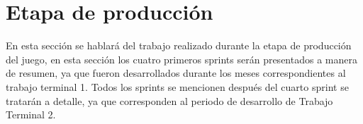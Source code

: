 \section{Etapa de producción}
En esta sección se hablará del trabajo realizado durante la etapa de producción 
del juego, en esta sección los cuatro primeros sprints serán presentados a manera 
de resumen, ya que fueron desarrollados durante los meses correspondientes al 
trabajo terminal 1. Todos los sprints se mencionen después del cuarto sprint se 
tratarán a detalle, ya que corresponden al periodo de desarrollo de Trabajo Terminal 2.

